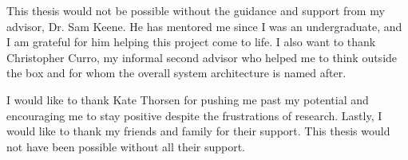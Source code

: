 This thesis would not be possible without the guidance and support from my advisor, Dr. Sam Keene. He has mentored me since I was an undergraduate, and I am grateful for him helping this project come to life. I also want to thank Christopher Curro, my informal second advisor who helped me to think outside the box and for whom the overall system architecture is named after.

I would like to thank Kate Thorsen for pushing me past my potential and encouraging me to stay positive despite the frustrations of research. Lastly, I would like to thank my friends and family for their support. This thesis would not have been possible without all their support.
